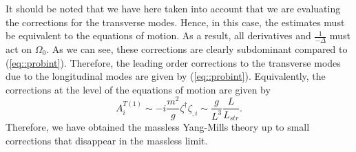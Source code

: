 \documentclass{article}
\begin{document}
 It should be noted that we have here taken into account that we are evaluating the corrections for the transverse modes. Hence, in this case, the estimates must be equivalent to the equations of motion. As a result, all derivatives and $\frac{1}{-\Delta}$ must act on $\Omega_0$. As we can see, these corrections are clearly subdominant compared to (\ref{eq::probint}). Therefore, the leading order corrections to the transverse modes due to the longitudinal modes are given by (\ref{eq::probint}). Equivalently, the corrections at the level of the equations of motion are given by 
 \begin{equation}
    A_i^{T(1)}\sim-i\frac{m^2}{g}\zeta^{\dagger}\zeta_{,i}\sim\frac{g}{L^3}\frac{L}{L_{str}}.
\end{equation}
Therefore, we have obtained the massless Yang-Mills theory up to small corrections that disappear in the massless limit.
 
 
\end{document}
